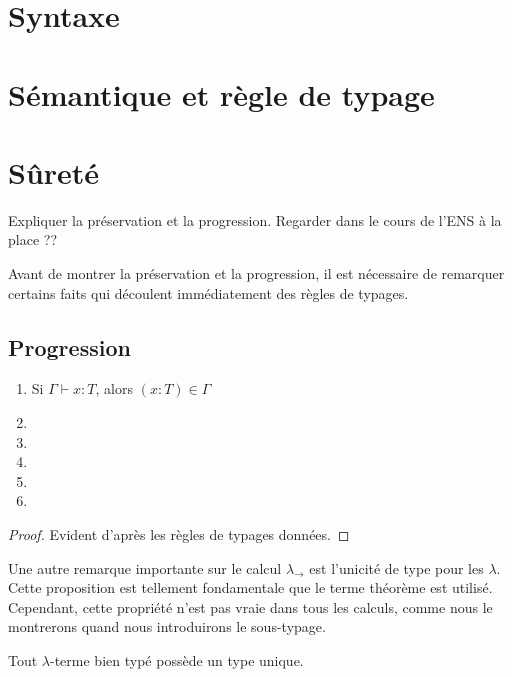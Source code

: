 \section{Syntaxe}

\section{Sémantique et règle de typage}

\section{Sûreté}

Expliquer la préservation et la progression.
Regarder dans le cours de l'ENS à la place ??

Avant de montrer la préservation et la progression, il est nécessaire de
remarquer certains faits qui découlent immédiatement des règles de typages.

\subsection*{Progression}

\begin{lemma} 
  \begin{enumerate}
    \item Si $\Gamma \vdash x : T$, alors $(x : T) \in \Gamma$
    \item 
    \item 
    \item 
    \item 
    \item 
  \end{enumerate}
\end{lemma}
  
\begin{proof}
  Evident d'après les règles de typages données.
\end{proof}

Une autre remarque importante sur le calcul $\lambda_{\rightarrow}$ est
l'unicité de type pour les $\lambda$. Cette proposition est tellement
fondamentale que le terme théorème est utilisé. Cependant, cette propriété n'est
pas vraie dans tous les calculs, comme nous le montrerons quand nous
introduirons le sous-typage.

\begin{theorem}
  Tout $\lambda$-terme bien typé possède un type unique.
\end{theorem}

